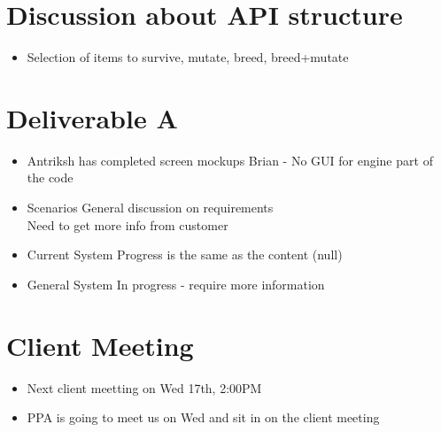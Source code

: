
\date{15th August, 2011}

\maketitle{}


\section{Discussion about API structure}
\begin{itemize}
 \item Selection of items to survive, mutate, breed, breed+mutate
\end{itemize}

\section{Deliverable A}
\begin{itemize}
 \item{Antriksh has completed screen mockups}
  Brian - No GUI for engine part of the code \\
 \item{Scenarios}
  General discussion on requirements \\
  Need to get more info from customer
 \item{Current System}
  Progress is the same as the content (null)
 \item{General System}
  In progress - require more information
\end{itemize}

\section{Client Meeting}
\begin{itemize}
 \item Next client meetting on Wed 17th, 2:00PM
 \item PPA is going to meet us on Wed and sit in on the client meeting 
\end{itemize}




